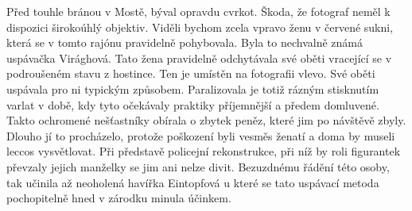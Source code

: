 
Před touhle bránou v Mostě, býval opravdu cvrkot. Škoda, že fotograf neměl k
dispozici širokoúhlý objektiv. Viděli bychom zcela vpravo ženu v červené sukni,
která se v tomto rajónu pravidelně pohybovala. Byla to nechvalně známá
uspávačka Virághová. Tato žena pravidelně odchytávala své oběti vracející se v
podroušeném stavu z hostince. Ten je umístěn na fotografii vlevo. Své oběti
uspávala pro ni typickým způsobem. Paralizovala je totiž rázným stisknutím
varlat v době, kdy tyto očekávaly praktiky příjemnější a předem domluvené.
Takto ochromené nešťastníky obírala o zbytek peněz, které jim po návštěvě
zbyly. Dlouho jí to procházelo, protože poškození byli vesměs ženatí a doma by
museli leccos vysvětlovat. Při představě policejní rekonstrukce, při níž by
roli figurantek převzaly jejich manželky se jim ani nelze divit. Bezuzdnému
řádění této osoby, tak učinila až neoholená havířka Eintopfová u které se tato
uspávací metoda pochopitelně hned v zárodku minula účinkem.
